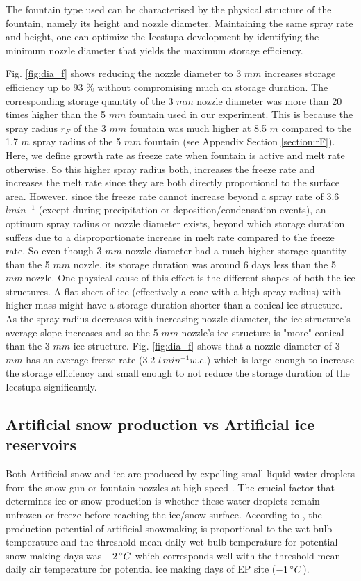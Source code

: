 \documentclass[utf8]{frontiersSCNS} %
\begin{document}
The fountain type used can be characterised by the physical structure of the fountain, namely its height and nozzle
diameter. Maintaining the same spray rate and height, one can optimize the Icestupa development by identifying the
minimum nozzle diameter that yields the maximum storage efficiency. 

Fig. \ref{fig:dia_f} shows reducing the nozzle diameter to 3 $mm$ increases storage efficiency up to 93 \% without
compromising much on storage duration.  The corresponding storage quantity of the 3 $mm$ nozzle diameter was more than
20 times higher than the 5 $mm$ fountain used in our experiment. This is because the spray radius $r_F$ of the 3 $mm$
fountain was much higher at 8.5 $m$ compared to the 1.7 $m$ spray radius of the 5 $mm$ fountain (see Appendix Section
\ref{section:rF}). Here, we define growth rate as freeze rate when fountain is active and melt rate otherwise. So this
higher spray radius both, increases the freeze rate  and increases the melt rate since they are both directly
proportional to the surface area. However, since the freeze rate cannot increase beyond a spray rate of 3.6 $l
min^{-1}$ (except during precipitation or deposition/condensation events), an optimum spray radius or nozzle diameter
exists, beyond which storage duration suffers due to a disproportionate increase in melt rate compared to the freeze
rate. So even though 3 $mm$ nozzle diameter had a much higher storage quantity than the 5 $mm$ nozzle, its storage
duration was around 6 days less than the 5 $mm$ nozzle. One physical cause of this effect is the different shapes of
both the ice structures. A flat sheet of ice (effectively a cone with a high spray radius) with higher mass might have
a storage duration shorter than a conical ice structure. As the spray radius decreases with increasing nozzle
diameter, the ice structure’s average slope increases and so the 5 $mm$ nozzle's ice structure is "more" conical than
the 3 $mm$ ice structure. Fig.  \ref{fig:dia_f} shows that a nozzle diameter of 3 $mm$ has an average freeze rate (3.2
$l \,min^{-1} w.e.$) which is large enough to increase the storage efficiency and small enough to not reduce the
storage duration of the Icestupa significantly.

\subsection{Artificial snow production vs Artificial ice reservoirs}
Both Artificial snow and ice are produced by expelling small liquid water droplets from the snow gun or fountain
nozzles at high speed \citep{BoundaryConditionsforArtificialSnowProductionintheAustrianAlps}. The crucial factor that
determines ice or snow production is whether these water droplets remain unfrozen or freeze before reaching the
ice/snow surface. According to \citep{HARTL2018123}, the production potential of artificial snowmaking is proportional
to the wet-bulb temperature and the threshold mean daily wet bulb temperature for potential snow making days was $- 2
\, \degree C$ which corresponds well with the threshold mean daily air temperature for potential ice making days of EP
site ($- 1 \, \degree C$).
\end{document}

